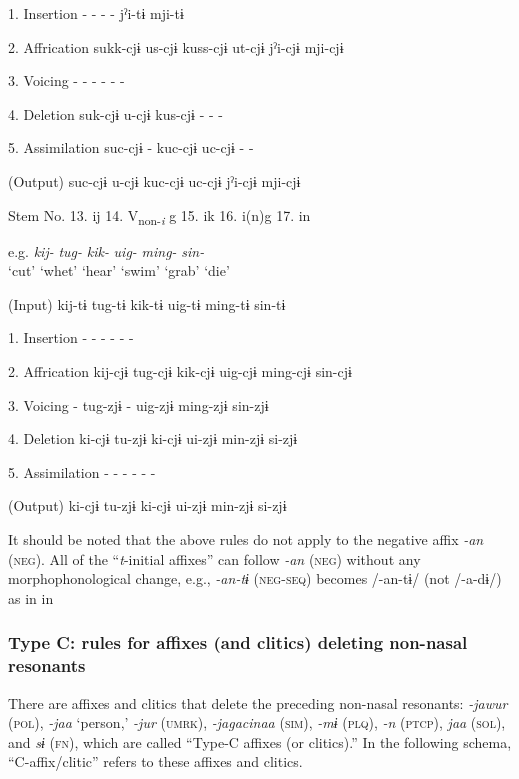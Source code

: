 \begin{table}
1.  Insertion  -  -  -  -  jˀi-tɨ  mji-tɨ

2.  Affrication  sukk-cjɨ  us-cjɨ  kuss-cjɨ  ut-cjɨ  jˀi-cjɨ  mji-cjɨ

3.  Voicing  -  -  -  -  -  -

4.  Deletion  suk-cjɨ  u-cjɨ  kus-cjɨ  -  -  -

5.  Assimilation  suc-cjɨ  -  kuc-cjɨ  uc-cjɨ  -  -

  (Output)  suc-cjɨ  u-cjɨ  kuc-cjɨ  uc-cjɨ  jˀi-cjɨ  mji-cjɨ

  Stem No.  13. ij  14. V\textsubscript{non-}\textit{\textsubscript{i}} g  15. ik  16. i(n)g    17. in

  e.g.  \textit{kij-}  \textit{tug-}  \textit{kik-}  \textit{uig-}  \textit{ming-}  \textit{sin-}\\
\glt ‘cut’  ‘whet’  ‘hear’  ‘swim’  ‘grab’  ‘die’

  (Input)  kij-tɨ  tug-tɨ  kik-tɨ  uig-tɨ  ming-tɨ  sin-tɨ

1.  Insertion  -  -  -  -  -  -

2.  Affrication  kij-cjɨ  tug-cjɨ  kik-cjɨ  uig-cjɨ  ming-cjɨ  sin-cjɨ

3.  Voicing  -  tug-zjɨ  -  uig-zjɨ  ming-zjɨ  sin-zjɨ

4.  Deletion  ki-cjɨ  tu-zjɨ  ki-cjɨ  ui-zjɨ  min-zjɨ  si-zjɨ

5.  Assimilation  -  -  -  -  -  -

  (Output)  ki-cjɨ  tu-zjɨ  ki-cjɨ  ui-zjɨ  min-zjɨ  si-zjɨ
\end{table}

It should be noted that the above rules do not apply to the negative affix \textit{-an} (\textsc{neg}). All of the “\textit{t}-initial affixes” can follow \textit{-an} (\textsc{neg}) without any morphophonological change, e.g., \textit{-an-tɨ} (\textsc{neg}-\textsc{seq}) becomes /-an-tɨ/ (not /-a-dɨ/) as in  in 

\subsubsection{Type C: rules for affixes (and clitics) deleting non-nasal resonants}
\label{bkm:Ref347177215}
There are affixes and clitics that delete the preceding non-nasal resonants: \textit{-jawur} (\textsc{pol}), \textit{-jaa} ‘person,’ \textit{-jur} (\textsc{umrk}), \textit{-jagacinaa} (\textsc{sim}), \textit{-mɨ} (\textsc{plq}), \textit{-n} (\textsc{ptcp}), \textit{jaa} (\textsc{sol}), and \textit{sɨ} (\textsc{fn}), which are called “Type-C affixes (or clitics).” In the following schema, “C-affix/clitic” refers to these affixes and clitics.

